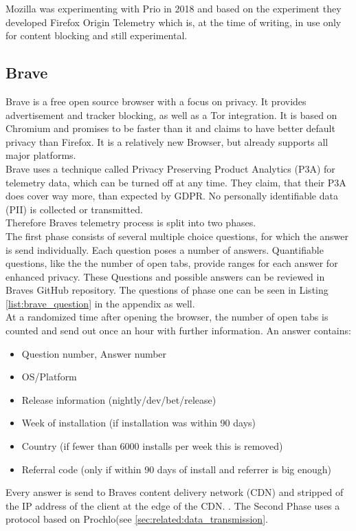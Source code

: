        
        
    
        Mozilla was experimenting with Prio in 2018 \cite{helmer_testing_2018} and based on the experiment they developed Firefox Origin Telemetry \cite{englehardt_next_2019} which is, at the time of writing, in use only for content blocking and still     experimental\cite{noauthor_origin_nodate}.\\
    
    
    \subsection{Brave}
        Brave is a free open source browser with a focus on privacy. It provides advertisement and tracker blocking, as well as a Tor integration. It is based on Chromium and promises to be faster than it and claims to have better default privacy than Firefox. It is a relatively new Browser, but already supports all major platforms\cite{brave_secure_nodate}.\\
        Brave uses a technique called Privacy Preserving Product Analytics (P3A) for telemetry data, which can be turned off at any time.
        They claim, that their P3A does cover way more, than expected by GDPR. No personally identifiable data (PII) is collected or transmitted.\\
        Therefore Braves telemetry process is split into two phases.\\
        The first phase consists of several multiple choice questions, for which the answer is send individually.
        Each question poses a number of answers. Quantifiable questions, like the the number of open tabs, provide ranges for each answer for enhanced privacy\cite{brave_privacy-preserving_2019}. These Questions and possible answers can be reviewed in Braves GitHub repository\cite{brave_software_inc_brave-browser_2019}.
        The questions of phase one can be seen in Listing \ref{list:brave_question} in the appendix as well.\\
        At a randomized time after opening the browser, the number of open tabs is counted and send out once an hour with further information\cite{brave_privacy-preserving_2019}.
        An answer contains:
        \begin{itemize}
            \item Question number, Answer number
            \item OS/Platform
            \item Release information (nightly/dev/bet/release)
            \item Week of installation (if installation was within 90 days)
            \item Country (if fewer than 6000 installs per week this is removed)
            \item Referral code (only if within 90 days of install and referrer is big enough)
        \end{itemize}
        Every answer is send to Braves content delivery network (CDN) and stripped of the IP address of the client at the edge of the CDN\cite{brave_privacy-preserving_2019}.
        . 
        The Second Phase uses a protocol based on Prochlo(see \ref{sec:related:data_transmission}. 
        
